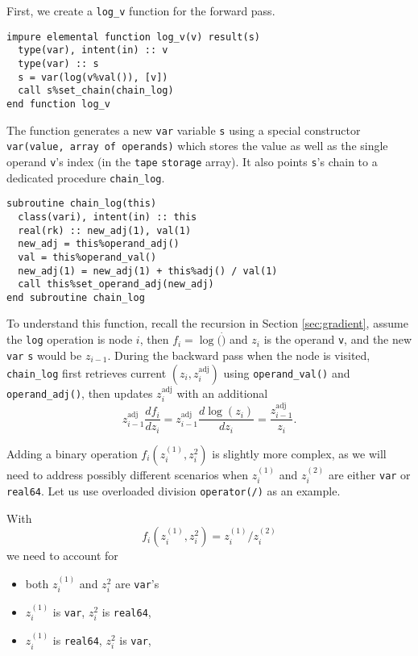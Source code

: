 \documentclass[12pt, reqno, oneside]{amsbook}
\numberwithin{equation}{chapter}
\begin{document}
First, we create a \texttt{log\_v} function for the forward pass.
\begin{verbatim}
impure elemental function log_v(v) result(s)
  type(var), intent(in) :: v
  type(var) :: s
  s = var(log(v%val()), [v])
  call s%set_chain(chain_log)
end function log_v
\end{verbatim}
The function generates a new \texttt{var} variable \texttt{s} using a special
constructor \texttt{var(value, array of operands)} which stores the value as
well as the single operand \texttt{v}'s index (in the \texttt{tape} \texttt{storage}
array). It also points \texttt{s}'s chain to a dedicated procedure \texttt{chain\_log}.
\begin{verbatim}
subroutine chain_log(this)
  class(vari), intent(in) :: this
  real(rk) :: new_adj(1), val(1)
  new_adj = this%operand_adj()
  val = this%operand_val()
  new_adj(1) = new_adj(1) + this%adj() / val(1)
  call this%set_operand_adj(new_adj)
end subroutine chain_log
\end{verbatim}
To understand this function, recall the recursion in Section \ref{sec:gradient},
assume the \texttt{log} operation is node \(i\), then \(f_i=\log(\dot)\) and
\(z_i\) is the operand \texttt{v}, and the new \texttt{var} \texttt{s} would be
\(z_{i-1}\). During the backward pass when the node is visited, \texttt{chain\_log} 
first retrieves current \((z_i, z_i^{\text{adj}})\)
using \texttt{operand\_val()} and \texttt{operand\_adj()}, then updates
\(z_i^{\text{adj}}\) with an additional
\begin{equation*}
z_{i-1}^{\text{adj}} \frac{df_i}{dz_i} = z_{i-1}^{\text{adj}}\frac{d\log(z_i)}{dz_i}=\frac{z_{i-1}^{\text{adj}}}{z_i}.
\end{equation*}

Adding a binary operation \(f_i(z_i^{(1)}, z_i^{2})\) is slightly more complex, as we will need to
address possibly different scenarios when \(z_i^{(1)}\) and \(z_i^{(2)}\)
are either \texttt{var} or \texttt{real64}. Let us use overloaded division \texttt{operator(/)} as an example.

With
\begin{equation*}
f_i(z_i^{(1)}, z_i^{2}) = z_i^{(1)} / z_i^{(2)}
\end{equation*}
we need to account for
\begin{itemize}
\item both \(z_i^{(1)}\) and \(z_i^{2}\) are \texttt{var}'s
\item \(z_i^{(1)}\) is \texttt{var}, \(z_i^{2}\) is \texttt{real64},
\item \(z_i^{(1)}\) is \texttt{real64}, \(z_i^{2}\) is \texttt{var},
\end{itemize}
\end{document}
